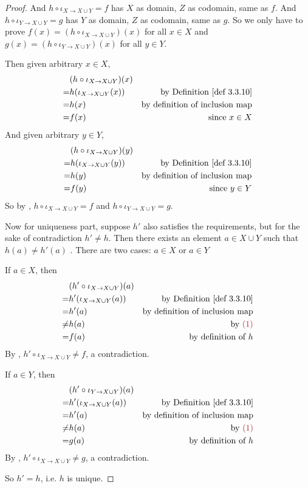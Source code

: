 \begin{proof}
And \(h \circ \iota_{X \to X \cup Y} = f\) has \(X\) as domain, \(Z\) as codomain, same as \(f\).
And \(h \circ \iota_{Y \to X \cup Y} = g\) has \(Y\) as domain, \(Z\) as codomain, same as \(g\).
So we only have to prove \(f(x) = (h \circ \iota_{X \to X \cup Y})(x)\) for all \(x \in X\) and \(g(x) = (h \circ \iota_{Y \to X \cup Y})(x)\) for all \(y \in Y\).

Then given arbitrary \(x \in X\),
\begin{align*}
      & (h \circ \iota_{X \to X \cup Y})(x) \\
    = & h(\iota_{X \to X \cup Y}(x)) & \text{by \DEF{3.3.10}} \\
    = & h(x) & \text{by definition of inclusion map} \\
    = & f(x) & \text{since \(x \in X\)}
\end{align*}
And given arbitrary \(y \in Y\),
\begin{align*}
      & (h \circ \iota_{X \to X \cup Y})(y) \\
    = & h(\iota_{X \to X \cup Y}(y)) & \text{by \DEF{3.3.10}} \\
    = & h(y) & \text{by definition of inclusion map} \\
    = & f(y) & \text{since \(y \in Y\)}
\end{align*}
So by , \(h \circ \iota_{X \to X \cup Y} = f\) and \(h \circ \iota_{Y \to X \cup Y} = g\).

Now for uniqueness part, suppose \(h'\) also satisfies the requirements, but for the sake of contradiction \(h' \neq h\).
Then there exists an element \(a \in X \cup Y\) such that \(h(a) \neq h'(a)\) .
There are two cases: \(a \in X\) or \(a \in Y\)

If \(a \in X\), then
\begin{align*}
      & (h' \circ \iota_{X \to X \cup Y})(a) \\
    = & h'(\iota_{X \to X \cup Y}(a)) & \text{by \DEF{3.3.10}} \\
    = & h'(a) & \text{by definition of inclusion map} \\
    \neq & h(a) & \text{by \MAROON{(1)}} \\
    = & f(a) & \text{by definition of \(h\)}
\end{align*}
By , \(h' \circ \iota_{X \to X \cup Y} \neq f\), a contradiction.

If \(a \in Y\), then
\begin{align*}
      & (h' \circ \iota_{Y \to X \cup Y})(a) \\
    = & h'(\iota_{X \to X \cup Y}(a)) & \text{by \DEF{3.3.10}} \\
    = & h'(a) & \text{by definition of inclusion map} \\
    \neq & h(a) & \text{by \MAROON{(1)}} \\
    = & g(a) & \text{by definition of \(h\)}
\end{align*}
By , \(h' \circ \iota_{X \to X \cup Y} \neq g\), a contradiction.

So \(h' = h\), i.e. \(h\) is unique.
\end{proof}